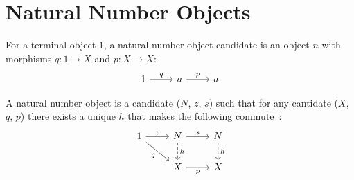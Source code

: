 \section{Natural Number Objects}
\begin{definition}

	For a terminal object $1$, a natural number object candidate is an object $n$
	with morphisms $q: 1 \to X$ and $p:X \to X$:
	\[\begin{tikzcd}[ampersand replacement=\&]
		1 \& a \& a
		\arrow["q", from=1-1, to=1-2]
		\arrow["p", from=1-2, to=1-3]
	\end{tikzcd}\]

	A natural number object is a candidate ($N$, $z$, $s$) such that for any
	cantidate ($X$, $q$, $p$) there exists a unique $h$ that makes the following
	commute~\parencite[p.~246]{awodey:category_theory}:
	\[\begin{tikzcd}[ampersand replacement=\&]
		1 \& N \& N \\
		\& X \& X
		\arrow["z", from=1-1, to=1-2]
		\arrow["q"', from=1-1, to=2-2]
		\arrow["s", from=1-2, to=1-3]
		\arrow["p"', from=2-2, to=2-3]
		\arrow["h", dashed, from=1-2, to=2-2]
		\arrow["h", dashed, from=1-3, to=2-3]
	\end{tikzcd}\]
\end{definition}
